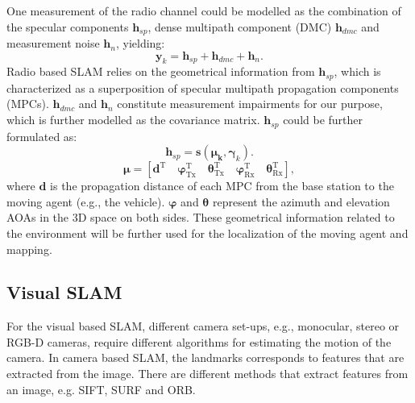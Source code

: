 One measurement of the radio channel could be modelled as the combination of the specular components $ \mathbf{h}_{sp} $, dense multipath component (DMC) $ \mathbf{h}_{dmc} $ and measurement noise $ \mathbf{h}_n $, yielding:
\begin{equation}
\mathbf{y}_k = \mathbf{h}_{sp} + \mathbf{h}_{dmc} + \mathbf{h}_n.
\label{eq:channelmodel}
\end{equation}
Radio based SLAM relies on the geometrical information from $ \mathbf{h}_{sp} $, which is characterized as a superposition of specular multipath propagation components (MPCs). $ \mathbf{h}_{dmc} $ and $ \mathbf{h}_n $ constitute measurement impairments for our purpose, which is further modelled as the covariance matrix. $ \mathbf{h}_{sp} $ could be further formulated as:
\begin{equation}
\mathbf{h}_{sp} = \textbf{s}(\mathbf{\boldsymbol{\mu}_k}, \mathbf{\boldsymbol{\gamma}}_k).
\label{eq:channelmodel}
\end{equation}
\begin{equation}
\mathbf{\boldsymbol{\mu}} = [\mathbf{\boldsymbol{d}}^\text{T} \quad  \mathbf{\boldsymbol{\varphi}}^\text{T}_\text{Tx} \quad  \mathbf{\boldsymbol{\theta}}^\text{T}_\text{Tx} \quad \mathbf{\boldsymbol{\varphi}}^\text{T}_\text{Rx} \quad  \mathbf{\boldsymbol{\theta}}^\text{T}_\text{Rx}],
\end{equation}
where $ \mathbf{\boldsymbol{d}} $ is the propagation distance of each MPC from the base station to the moving agent (e.g., the vehicle). $ \mathbf{\boldsymbol{\varphi}} $ and $ \mathbf{\boldsymbol{\theta}} $ represent the azimuth and elevation AOAs in the 3D space on both sides. These geometrical information related to the environment will be further used for the localization of the moving agent and mapping.



\subsection{Visual SLAM}

For the visual based \gls{SLAM}, different camera set-ups, e.g., monocular,
stereo or RGB-D
cameras, require different algorithms for estimating the motion of
the camera. In camera based \gls{SLAM}, the landmarks corresponds to features
that are extracted from the image. There are different methods that extract
features from an image, e.g. \gls{SIFT}\cite{Lowe:1999:ORL:850924.851523},
\gls{SURF}\cite{Bay:2008:SRF:1370312.1370556} and
\gls{ORB}\cite{Rublee:2011:OEA:2355573.2356268}.

